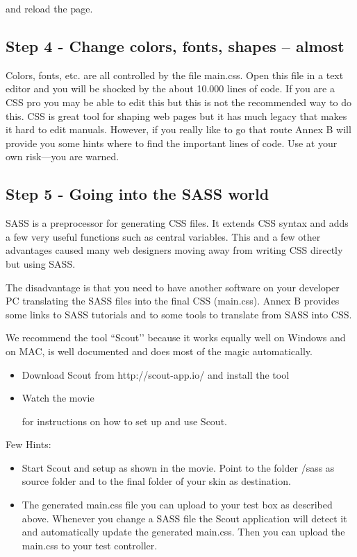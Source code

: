 

and reload the page.

\subsection{Step 4 - Change colors, fonts, shapes – almost}

Colors, fonts, etc. are all controlled by the file main.css. Open this file in a text 
editor and you will be shocked by the about 10.000 lines of code. If you are a CSS pro 
you may be able to edit this but this is not the recommended way to do this. CSS is great
 tool for shaping web pages but it has much legacy that makes it hard to edit manuals.
However, if you really like to go that route Annex B will provide you some hints where to 
find the important lines of code. Use at your own risk---you are warned.


\subsection{Step 5 - Going into the SASS world}

SASS is a preprocessor for generating CSS files. It extends CSS syntax and adds a few 
very useful functions such as central variables. This and a few other advantages caused 
many web designers moving away from writing CSS directly but using SASS.

The disadvantage is that you need to have another software on your developer PC 
translating the SASS files into the final CSS (main.css). Annex B provides some links to 
SASS tutorials and to some tools to translate from SASS into CSS.

We recommend the tool ``Scout’’ because it works equally well on Windows and on MAC, 
is well documented and does most of the magic automatically.

\begin{itemize}
\item Download Scout from http://scout-app.io/ and install the tool
\item Watch the movie


for instructions on how to set up and use Scout.
\end{itemize}

Few Hints:

\begin{itemize}
\item Start Scout and setup as shown in the movie. Point to the folder /sass as source 
folder and to the final folder of your skin as destination.
\item The generated main.css file you can upload to your test box as described above. 
Whenever you change a SASS file the Scout application will detect it and automatically 
update the generated main.css. Then you can upload the main.css to your test controller.
\end{itemize}

